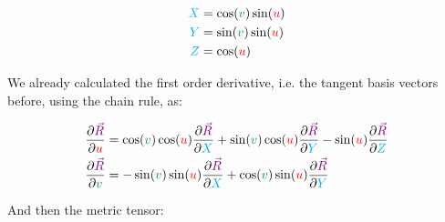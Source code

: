\begin{align*}
    \begingroup\color{cyan}X\endgroup &= \cos(\begingroup\color{teal}v\endgroup)\sin(\begingroup\color{red}u\endgroup)\\
    \begingroup\color{cyan}Y\endgroup &= \sin(\begingroup\color{teal}v\endgroup)\sin(\begingroup\color{red}u\endgroup)\\
    \begingroup\color{cyan}Z\endgroup &= \cos(\begingroup\color{red}u\endgroup)
\end{align*}

We already calculated the first order derivative, i.e. the tangent basis vectors before, using the chain rule, as:

\begin{align*}
    \frac{\partial \begingroup\color{violet}\vec{R}\endgroup}{\partial \begingroup\color{red}u\endgroup} &= \cos(\begingroup\color{teal}v\endgroup) \cos(\begingroup\color{red}u\endgroup)\frac{\partial \begingroup\color{violet}\vec{R}\endgroup}{\partial \begingroup\color{cyan}X\endgroup} 
    + \sin(\begingroup\color{teal}v\endgroup) \cos(\begingroup\color{red}u\endgroup)\frac{\partial \begingroup\color{violet}\vec{R}\endgroup}{\partial \begingroup\color{cyan}Y\endgroup}
    - \sin(\begingroup\color{red}u\endgroup)\frac{\partial \begingroup\color{violet}\vec{R}\endgroup}{\partial \begingroup\color{cyan}Z\endgroup}\\
    \frac{\partial \begingroup\color{violet}\vec{R}\endgroup}{\partial \begingroup\color{teal}v\endgroup} &= -\sin(\begingroup\color{teal}v\endgroup) \sin(\begingroup\color{red}u\endgroup)\frac{\partial \begingroup\color{violet}\vec{R}\endgroup}{\partial \begingroup\color{cyan}X\endgroup}
    + \cos(\begingroup\color{teal}v\endgroup) \sin(\begingroup\color{red}u\endgroup)\frac{\partial \begingroup\color{violet}\vec{R}\endgroup}{\partial \begingroup\color{cyan}Y\endgroup}
\end{align*}

And then the metric tensor:

